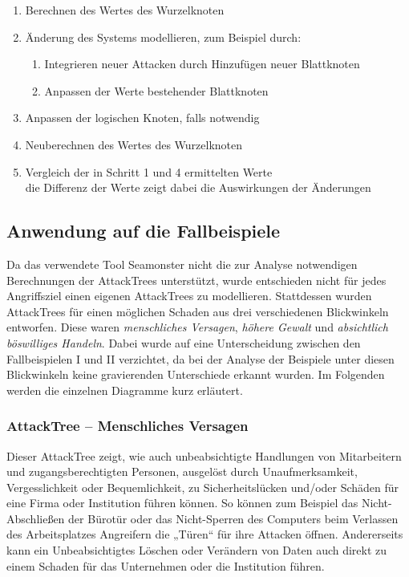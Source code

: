 \begin{enumerate}
\item Berechnen des Wertes des Wurzelknoten
\item Änderung des Systems modellieren, zum Beispiel durch:
\begin{enumerate}
\item Integrieren neuer Attacken durch Hinzufügen neuer Blattknoten
\item Anpassen der Werte bestehender Blattknoten
\end{enumerate}
\item Anpassen der logischen Knoten, falls notwendig
\item Neuberechnen des Wertes des Wurzelknoten
\item Vergleich der in Schritt 1 und 4 ermittelten Werte\\
die Differenz der Werte zeigt dabei die Auswirkungen der Änderungen
\end{enumerate}
\clearpage

\subsection{Anwendung auf die Fallbeispiele}
Da das verwendete Tool Seamonster nicht die zur Analyse notwendigen Berechnungen der AttackTrees unterstützt, wurde entschieden nicht für jedes Angriffsziel einen eigenen AttackTrees zu modellieren. Stattdessen wurden AttackTrees für einen möglichen Schaden aus drei verschiedenen Blickwinkeln entworfen. Diese waren \textit{menschliches Versagen}, \textit{höhere Gewalt} und \textit{absichtlich böswilliges Handeln}. Dabei wurde auf eine Unterscheidung zwischen den Fallbeispielen I und II verzichtet, da bei der Analyse der Beispiele unter diesen Blickwinkeln keine gravierenden Unterschiede erkannt wurden. Im Folgenden werden die einzelnen Diagramme kurz erläutert.

\subsubsection{AttackTree – Menschliches Versagen}

Dieser AttackTree zeigt, wie auch unbeabsichtigte Handlungen von Mitarbeitern und zugangsberechtigten Personen, ausgelöst durch Unaufmerksamkeit, Vergesslichkeit oder Bequemlichkeit, zu Sicherheitslücken und/oder Schäden für eine Firma oder Institution führen können. So können zum Beispiel das Nicht-Abschließen der Bürotür oder das Nicht-Sperren des Computers beim Verlassen des Arbeitsplatzes Angreifern die „Türen“ für ihre Attacken öffnen. Andererseits kann ein Unbeabsichtigtes Löschen oder Verändern von Daten auch direkt zu einem Schaden für das Unternehmen oder die Institution führen.

